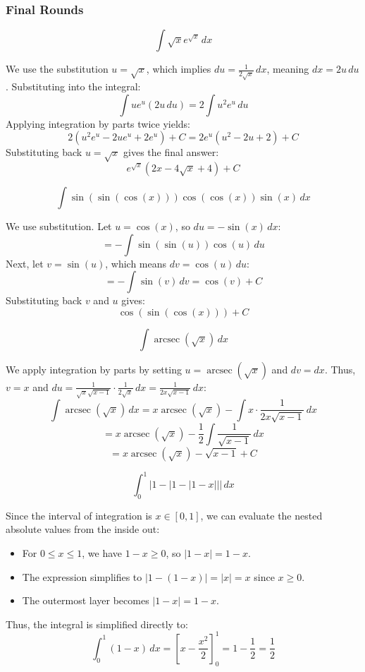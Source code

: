 \subsubsection*{Final Rounds}

\begin{questions}

    \question 
    \[ \int \sqrt{x}e^{\sqrt{x}} \, dx \]
    \begin{solution}
        We use the substitution $u = \sqrt{x}$, which implies $du = \frac{1}{2\sqrt{x}} \, dx$, meaning $dx = 2u \, du$. Substituting into the integral:
        \[ \int u e^u (2u \, du) = 2 \int u^2 e^u \, du \]
        Applying integration by parts twice yields:
        \[ 2 \left( u^2 e^u - 2u e^u + 2e^u \right) + C = 2e^u(u^2 - 2u + 2) + C \]
        Substituting back $u = \sqrt{x}$ gives the final answer:
        \[ e^{\sqrt{x}}(2x - 4\sqrt{x} + 4) + C \]
    \end{solution}

    \question 
    \[ \int \sin(\sin(\cos(x)))\cos(\cos(x))\sin(x) \, dx \]
    \begin{solution}
        We use substitution. Let $u = \cos(x)$, so $du = -\sin(x) \, dx$:
        \[ = -\int \sin(\sin(u))\cos(u) \, du \]
        Next, let $v = \sin(u)$, which means $dv = \cos(u) \, du$:
        \[ = -\int \sin(v) \, dv = \cos(v) + C \]
        Substituting back $v$ and $u$ gives:
        \[ \cos(\sin(\cos(x))) + C \]
    \end{solution}

    \question 
    \[ \int \operatorname{arcsec}(\sqrt{x}) \, dx \]
    \begin{solution}
        We apply integration by parts by setting $u = \operatorname{arcsec}(\sqrt{x})$ and $dv = dx$. Thus, $v = x$ and $du = \frac{1}{\sqrt{x}\sqrt{x-1}} \cdot \frac{1}{2\sqrt{x}} \, dx = \frac{1}{2x\sqrt{x-1}} \, dx$:
        \[ \int \operatorname{arcsec}(\sqrt{x}) \, dx = x\operatorname{arcsec}(\sqrt{x}) - \int x \cdot \frac{1}{2x\sqrt{x-1}} \, dx \]
        \[ = x\operatorname{arcsec}(\sqrt{x}) - \frac{1}{2} \int \frac{1}{\sqrt{x-1}} \, dx \]
        \[ = x\operatorname{arcsec}(\sqrt{x}) - \sqrt{x-1} + C \]
    \end{solution}

    \question 
    \[ \int_{0}^{1} |1-|1-|1-x||| \, dx \]
    \begin{solution}
        Since the interval of integration is $x \in [0, 1]$, we can evaluate the nested absolute values from the inside out:
        \begin{itemize}
            \item For $0 \le x \le 1$, we have $1-x \ge 0$, so $|1-x| = 1-x$.
            \item The expression simplifies to $|1 - (1-x)| = |x| = x$ since $x \ge 0$.
            \item The outermost layer becomes $|1 - x| = 1 - x$.
        \end{itemize}
        Thus, the integral is simplified directly to:
        \[ \int_{0}^{1} (1-x) \, dx = \left[ x - \frac{x^2}{2} \right]_{0}^{1} = 1 - \frac{1}{2} = \frac{1}{2} \]
    \end{solution}


\end{questions}
